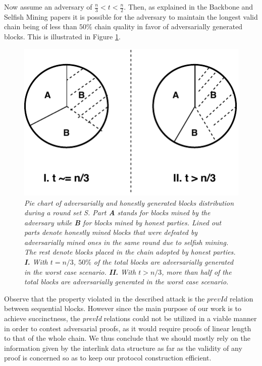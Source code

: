 Now assume an adversary of $ \frac{n}{3} < t < \frac{n}{2} $. Then, as explained
in the Backbone and Selfish Mining papers \cite{Backbone}\cite{selfish_mining} it
is possible for the adversary to maintain the longest valid chain being of less
than $50\%$ chain quality in favor of adversarially generated blocks. This is
illustrated in Figure \ref{fig:selfish_mining_pie}.

\begin{figure}[h!]
	\begin{center}
		\includegraphics[scale=0.8]{figures/selfish_mining_pie.pdf}
	\end{center}
	\caption{\textit{Pie chart of adversarially and honestly generated blocks distribution
	during a round set S. Part \textbf{A} stands for blocks mined by the adversary while
	\textbf{B} for blocks mined by honest parties. Lined out parts denote honestly mined
	blocks that were defeated by adversarially mined ones in the same round due to selfish
	mining. The rest denote blocks placed in the chain adopted by honest parties.
	\textbf{I.} With $t = n/3$, $50\%$ of the total blocks are adversarially generated
	in the worst case scenario. \textbf{II.} With $t > n/3$, more than half of the
	total blocks are adversarially generated in the worst case scenario.}}
	\label{fig:selfish_mining_pie}
\end{figure}

Observe that the property violated in the described attack is the $prevId$ relation
between sequential blocks. However since the main purpose of our work is to achieve
succinctness, the \textit{prevId} relations could not be utilized in a viable manner
in order to contest adversarial proofs, as it would require proofs of linear length
to that of the whole chain.  We thus conclude that we should mostly rely on the
information given by the interlink data structure as far as the validity of any proof
is concerned so as to keep our protocol construction efficient.

